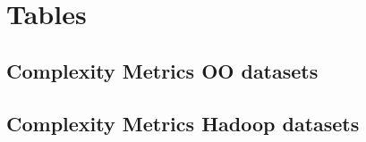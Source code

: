 \chapter{Tables}\label{chp:tables}

\section{Complexity Metrics OO datasets}\label{sec:compl-oo}



\section{Complexity Metrics Hadoop datasets}\label{sec:compl-hadoop}

